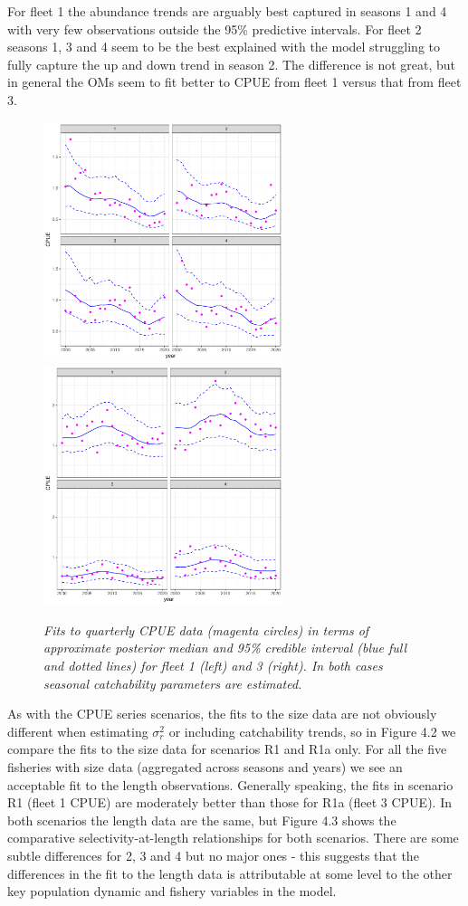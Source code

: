 \documentclass[11pt]{article}
\newcommand{\sigr}{\sigma^2_r}
\begin{document}
For fleet 1 the abundance trends are arguably best captured in seasons 1 and 4 with very few observations outside the 95\% predictive intervals. For fleet 2 seasons 1, 3 and 4 seem to be the best explained with the model struggling to fully capture the up and down trend in season 2. The difference is not great, but in general the OMs seem to fit better to CPUE from fleet 1 versus that from fleet 3.

\begin{figure}[hb]
    \begin{center}
        \includegraphics[width=7cm,height=7cm]{figs/case4_cpuefits.pdf}\includegraphics[width=7cm,height=7cm]{figs/case4a_cpuefits.pdf}
    \end{center}
    \caption{\textit{Fits to quarterly CPUE data (magenta circles) in terms of approximate posterior
median and 95\% credible interval (blue full and dotted lines) for fleet 1 (left) and 3 (right). In both
cases seasonal catchability parameters are estimated.}}
\end{figure}

As with the CPUE series scenarios, the fits to the size data are not obviously different when estimating $\sigr$ or including catchability trends, so in Figure 4.2 we compare the fits to the size data for scenarios R1 and R1a only. For all the five fisheries with size data (aggregated across
seasons and years) we see an acceptable fit to the length observations. Generally speaking, the fits in scenario R1 (fleet 1 CPUE) are moderately better than those for R1a (fleet 3 CPUE). In both scenarios the length data are the same, but Figure 4.3 shows the comparative selectivity-at-length relationships for both scenarios. There are some subtle differences for 2, 3 and 4 but no major ones - this suggests that the differences in the fit to the length data is attributable at some level to the other key population dynamic and fishery variables in the model.
\end{document}
